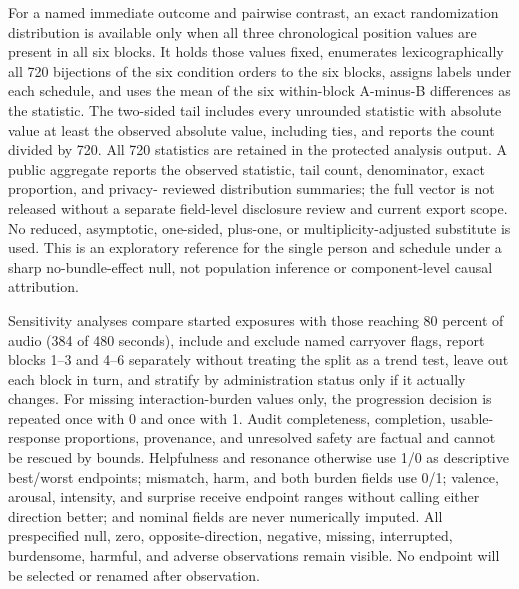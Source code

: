 For a named immediate outcome and pairwise contrast, an exact randomization
distribution is available only when all three chronological position values
are present in all six blocks. It holds those values fixed, enumerates
lexicographically all 720 bijections of the six condition orders to the six
blocks, assigns labels under each schedule, and uses the mean of the six
within-block A-minus-B differences as the statistic. The two-sided tail includes
every unrounded statistic with absolute value at least the observed absolute
value, including ties, and reports the count divided by 720. All 720 statistics
are retained in the protected analysis output. A public aggregate reports the
observed statistic, tail count, denominator, exact proportion, and privacy-
reviewed distribution summaries; the full vector is not released without a
separate field-level disclosure review and current export scope. No reduced,
asymptotic, one-sided, plus-one, or multiplicity-adjusted substitute is used.
This is an exploratory reference for the single person and schedule under a
sharp no-bundle-effect null, not population inference or component-level causal
attribution.

Sensitivity analyses compare started exposures with those reaching 80 percent
of audio (384 of 480 seconds), include and exclude named carryover flags, report
blocks 1--3 and 4--6 separately without treating the split as a trend test,
leave out each block in turn, and stratify by administration status only if it
actually changes. For missing interaction-burden values only, the progression
decision is repeated once with 0 and once with 1. Audit completeness,
completion, usable-response proportions, provenance, and unresolved safety are
factual and cannot be rescued by bounds. Helpfulness and resonance otherwise
use 1/0 as descriptive best/worst endpoints; mismatch, harm, and both burden
fields use 0/1; valence, arousal, intensity, and surprise receive endpoint
ranges without calling either direction better; and nominal fields are never
numerically imputed. All prespecified null, zero, opposite-direction, negative,
missing, interrupted, burdensome, harmful, and adverse observations remain
visible. No endpoint will be selected or renamed after observation.

